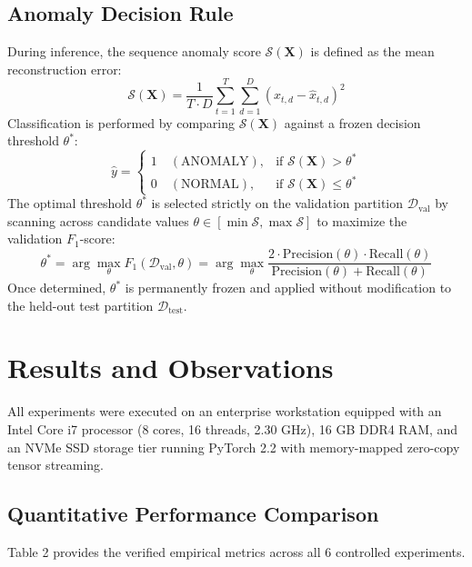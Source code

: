 \documentclass[twocolumn]{article}
\begin{document}
\subsection{Anomaly Decision Rule}
During inference, the sequence anomaly score $\mathcal{S}(\mathbf{X})$ is defined as the mean reconstruction error:
\begin{equation}
    \mathcal{S}(\mathbf{X}) = \frac{1}{T \cdot D} \sum_{t=1}^T \sum_{d=1}^D (x_{t,d} - \hat{x}_{t,d})^2
\end{equation}
Classification is performed by comparing $\mathcal{S}(\mathbf{X})$ against a frozen decision threshold $\theta^*$:
\begin{equation}
    \hat{y} = \begin{cases} 1 \quad (\text{ANOMALY}), & \text{if } \mathcal{S}(\mathbf{X}) > \theta^* \\ 0 \quad (\text{NORMAL}), & \text{if } \mathcal{S}(\mathbf{X}) \le \theta^* \end{cases}
\end{equation}
The optimal threshold $\theta^*$ is selected strictly on the validation partition $\mathcal{D}_{\text{val}}$ by scanning across candidate values $\theta \in [\min \mathcal{S}, \max \mathcal{S}]$ to maximize the validation $F_1$-score:
\begin{equation}
    \theta^* = \arg\max_{\theta} F_1(\mathcal{D}_{\text{val}}, \theta) = \arg\max_{\theta} \frac{2 \cdot \text{Precision}(\theta) \cdot \text{Recall}(\theta)}{\text{Precision}(\theta) + \text{Recall}(\theta)}
\end{equation}
Once determined, $\theta^*$ is permanently frozen and applied without modification to the held-out test partition $\mathcal{D}_{\text{test}}$.

\section{Results and Observations}
All experiments were executed on an enterprise workstation equipped with an Intel Core i7 processor (8 cores, 16 threads, 2.30 GHz), 16 GB DDR4 RAM, and an NVMe SSD storage tier running PyTorch 2.2 with memory-mapped zero-copy tensor streaming.

\subsection{Quantitative Performance Comparison}
Table 2 provides the verified empirical metrics across all 6 controlled experiments.
\end{document}
